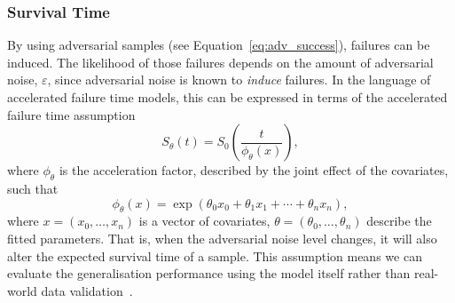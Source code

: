 \documentclass[conference]{IEEEtran}%
\begin{document}
\subsubsection{Survival Time}
\label{accelerated}
By using adversarial samples (see Equation~\ref{eq:adv_success}), failures can be induced. The likelihood of those failures depends on the amount of adversarial noise, $\varepsilon$, since adversarial noise is known to \textit{induce} failures.
In the language of accelerated failure time models, this can be expressed in terms of the accelerated failure time assumption~\cite{kleinbaum1996survival}
\begin{equation} \label{assumption}
    S_\theta(t) = S_0 \left( \frac{t}{\phi_\theta(x)} \right),
\end{equation}
where $\phi_\theta$ is the acceleration factor, described by the joint effect of the covariates, such that
\[
    \phi_{\theta}(x) = \exp{ \left( \theta_{0} x_{0} + \theta_{1} x_{1} + \cdots + \theta_{n} x_{n} \right) },
\]
where $x=(x_0, \ldots, x_n)$ is a vector of covariates, $\theta=(\theta_0, \ldots, \theta_n)$ describe the fitted parameters. 
That is, when the adversarial noise level changes, it will also alter the expected survival time of a sample.
This assumption means we can evaluate the generalisation performance using the model itself rather than real-world data validation~\cite{kleinbaum1996survival,meyers_aft}.
\end{document}
